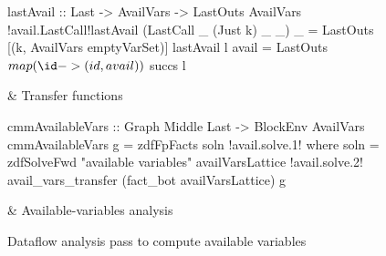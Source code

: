 \documentclass[blockstyle,preprint,natbib,nocopyrightspace]{sigplanconf}
\newcommand\figlabel[1]{\label{fig:#1}}
\begin{document}
\begin{figure*}
\begin{codetable}
\begin{code}
lastAvail :: Last -> AvailVars -> LastOuts AvailVars
!avail.LastCall!lastAvail (LastCall _ (Just k) _ _) _ = LastOuts [(k, AvailVars emptyVarSet)]
lastAvail l avail = LastOuts $ map (\id -> (id, avail)) $ succs l
\end{code}%
\B
& Transfer \mbox{functions}\\
\hline

\T\begin{code}
cmmAvailableVars :: Graph Middle Last -> BlockEnv AvailVars
cmmAvailableVars g = zdfFpFacts soln
!avail.solve.1!  where soln = zdfSolveFwd "available variables" availVarsLattice 
!avail.solve.2!               avail_vars_transfer (fact_bot availVarsLattice) g
\end{code}%
\B
& Available-variables analysis\\

\end{codetable}
\caption{Dataflow analysis pass to compute available variables}
\figlabel{avail-all}
\figlabel{avail}
\figlabel{avail-lattice}
\figlabel{avail-gen-kill}
\figlabel{avail-transfers}
\figlabel{avail-running}
\end{figure*}

% 
% 
% 
% 
\end{document}

